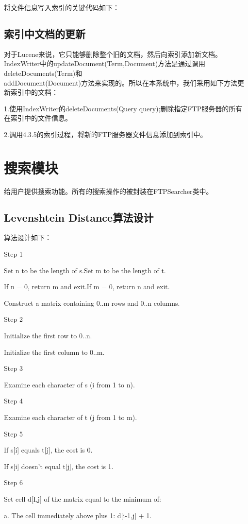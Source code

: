 将文件信息写入索引的关键代码如下：



\subsection{索引中文档的更新}
对于Lucene来说，它只能够删除整个旧的文档，然后向索引添加新文档。Index\-Writer中的update\-Document(Term,Document)方法是通过调用deleteDocuments(Term)和\\add\-Document(Document)方法来实现的。所以在本系统中，我们采用如下方法更新索引中的文档：

1.使用IndexWriter的deleteDocuments(Query query);删除指定FTP服务器的所有在索引中的文件信息。

2.调用4.3.5的索引过程，将新的FTP服务器文件信息添加到索引中。
\section{搜索模块}
给用户提供搜索功能。所有的搜索操作的被封装在FTPSearcher类中。
\subsection{Levenshtein Distance算法设计}
算法设计如下：

Step 1

Set n to be the length of s.Set m to be the length of t.

If n = 0, return m and exit.If m = 0, return n and exit.

Construct a matrix containing 0..m rows and 0..n columns.

Step 2

Initialize the first row to 0..n.

Initialize the first column to 0..m.

Step 3 

Examine each character of s (i from 1 to n).

Step 4 

Examine each character of t (j from 1 to m).

Step 5 

If s[i] equals t[j], the cost is 0.

If s[i] doesn’t equal t[j], the cost is 1.

Step 6

Set cell d[I,j] of the matrix equal to the minimum of:

a. The cell immediately above plus 1: d[i-1,j] + 1.

